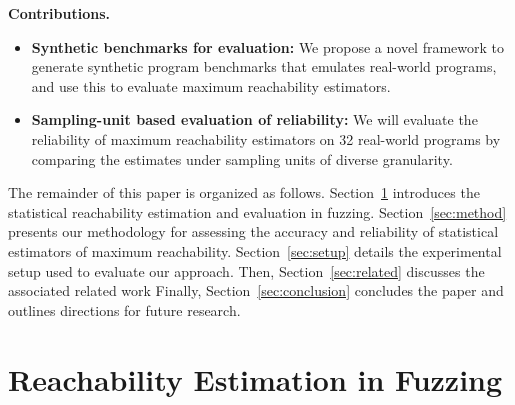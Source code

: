 \documentclass[conference]{IEEEtran}
\begin{document}

\noindent{}\textbf{Contributions.}

\begin{itemize}
  \item \textbf{Synthetic benchmarks for evaluation:} We propose a novel
framework to generate synthetic program benchmarks that emulates real-world
programs, and use this to evaluate maximum reachability estimators.

  \item \textbf{Sampling-unit based evaluation of reliability:} We will evaluate
    the reliability of maximum reachability estimators on 32 real-world programs
    by comparing the estimates under sampling units of diverse granularity.

    

\end{itemize}

The remainder of this paper is organized as follows. Section~\ref{sec:model} introduces the statistical reachability estimation and evaluation in fuzzing. Section~\ref{sec:method} presents our methodology for assessing the accuracy and reliability of statistical estimators of maximum reachability. Section~\ref{sec:setup} details the experimental setup used to evaluate our approach. Then, Section~\ref{sec:related} discusses the associated related work Finally, Section~\ref{sec:conclusion} concludes the paper and outlines directions for future research.

\section{Reachability Estimation in Fuzzing} \label{sec:model}
\end{document}

